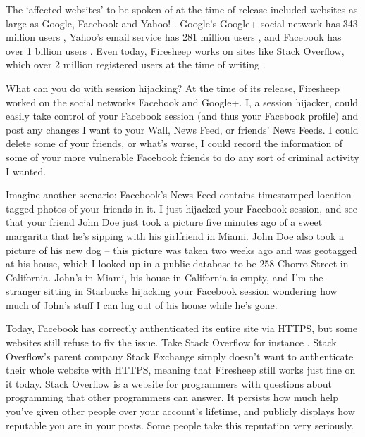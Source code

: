 \documentclass[11pt]{article}
\begin{document}
\begin{multicols}{2}
The `affected websites' to be spoken of at the time of release included websites as large as Google, Facebook and Yahoo! \cite{firesheep-source}. Google's Google+ social network has 343 million users \cite{google-stats}, Yahoo's email service has 281 million users \cite{yahoo-stats}, and Facebook has over 1 billion users \cite{facebook-stats}. Even today, Firesheep works on sites like Stack Overflow, which over 2 million registered users at the time of writing \cite{stack-overflow-stats}.

What can you do with session hijacking? At the time of its release, Firesheep worked on the social networks Facebook and Google+. I, a session hijacker, could easily take control of your Facebook session (and thus your Facebook profile) and post any changes I want to your Wall, News Feed, or friends' News Feeds. I could delete some of your friends, or what's worse, I could record the information of some of your more vulnerable Facebook friends to do any sort of criminal activity I wanted.

Imagine another scenario: Facebook's News Feed contains timestamped location-tagged photos of your friends in it. I just hijacked your Facebook session, and see that your friend John Doe just took a picture five minutes ago of a sweet margarita that he's sipping with his girlfriend in Miami. John Doe also took a picture of his new dog -- this picture was taken two weeks ago and was geotagged at his house, which I looked up in a public database to be 258 Chorro Street in California. John's in Miami, his house in California is empty, and I'm the stranger sitting in Starbucks hijacking your Facebook session wondering how much of John's stuff I can lug out of his house while he's gone.

Today, Facebook has correctly authenticated its entire site via HTTPS, but some websites still refuse to fix the issue. Take Stack Overflow for instance \cite{stack-exchange}. Stack Overflow's parent company Stack Exchange simply doesn't want to authenticate their whole website with HTTPS, meaning that Firesheep still works just fine on it today. Stack Overflow is a website for programmers with questions about programming that other programmers can answer. It persists how much help you've given other people over your account's lifetime, and publicly displays how reputable you are in your posts. Some people take this reputation very seriously.


\end{multicols}
\end{document}
